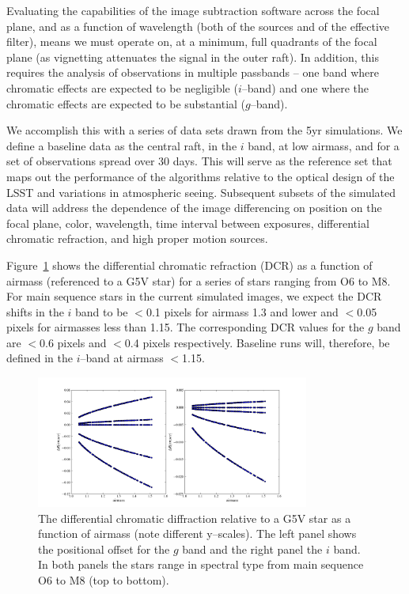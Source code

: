 \documentclass[prd, nofootinbib, floatfix, 11pt,tightenlines,times]{article}
\begin{document}
Evaluating the capabilities of the image subtraction software across
the focal plane, and as a function of wavelength (both of the sources
and of the effective filter),  means we must operate on, at a minimum,
full quadrants of the focal plane (as vignetting attenuates the signal
in the outer raft).  In addition, this requires the analysis of observations in multiple
passbands -- one band where chromatic effects are expected to be
negligible ($i$--band) and one where the chromatic effects are
expected to be substantial ($g$--band).

We accomplish this with a series of data sets drawn from the 5yr
simulations. We define a baseline data as the central raft, in the $i$
band, at low airmass, and for a set of observations spread
over 30 days.  This will serve as the reference set that maps out the
performance of the algorithms relative to the optical design of the
LSST and variations in atmospheric seeing. Subsequent subsets of the
simulated data will address the dependence of the image differencing
on position on the focal plane, color, wavelength, time interval
between exposures, differential chromatic refraction, and high proper
motion sources. 

Figure~\ref{DCR} shows the differential chromatic refraction (DCR) as
a function of airmass (referenced to a G5V star) for a series of stars
ranging from O6 to M8. For main sequence stars in the current
simulated images, we expect the DCR shifts in the $i$ band to be
$<$0.1 pixels for airmass 1.3 and lower and $<$0.05 pixels for
airmasses less than 1.15. The corresponding DCR values for the $g$
band are $<$0.6 pixels and $<$0.4 pixels respectively. Baseline runs
will, therefore, be defined in the $i$--band at airmass $<$1.15.

\begin{figure}
\centerline{\includegraphics[width=0.8\textwidth]{Figures/DCR_R_stars.png}}
\caption{The differential chromatic diffraction relative to a G5V star
  as a function of airmass (note different y--scales). The left panel shows the positional offset
  for the $g$ band and the right panel the $i$ band. In both panels
  the stars range in spectral type from main sequence O6 to M8 (top to bottom).}
\label{DCR}
\end{figure}
\end{document}
